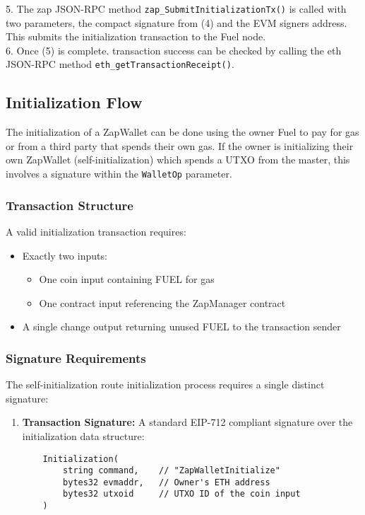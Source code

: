 5. The zap JSON-RPC method \texttt{zap\_SubmitInitializationTx()} is called with two parameters, the compact signature from (4) and the EVM
signers address. This submits the initialization transaction to the Fuel node.\\

6. Once (5) is complete. transaction success can be checked by calling the eth JSON-RPC method \texttt{eth\_getTransactionReceipt()}.\\


\subsection{Initialization Flow}
The initialization of a ZapWallet can be done using the owner Fuel  to pay for gas or from a third party that spends their own gas. If the owner is
initializing their own ZapWallet (self-initialization) which spends a  UTXO from the master, this involves a signature within the \texttt{WalletOp} parameter.

\subsubsection{Transaction Structure}
A valid initialization transaction requires:
\begin{itemize}
    \item Exactly two inputs:
        \begin{itemize}
            \item One coin input containing FUEL  for gas
            \item One contract input referencing the ZapManager contract
        \end{itemize}
    \item A single change output returning unused FUEL  to the transaction sender
\end{itemize}

\subsubsection{Signature Requirements}
The self-initialization route initialization process requires a single distinct signature:
\begin{enumerate}
    \item \textbf{Transaction Signature:} A standard EIP-712 compliant signature over the initialization data structure:
    \begin{small}
    \begin{verbatim}
    Initialization(
        string command,    // "ZapWalletInitialize"
        bytes32 evmaddr,   // Owner's ETH address
        bytes32 utxoid     // UTXO ID of the coin input
    )
    \end{verbatim}
    \end{small}
\end{enumerate}

